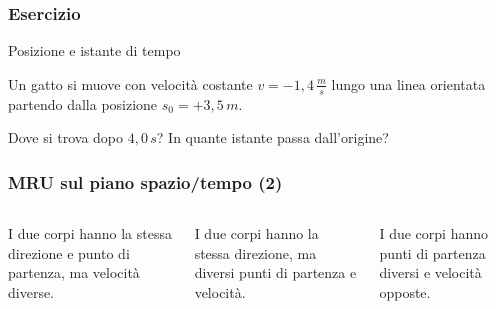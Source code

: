 \documentclass[]{beamer}
\theoremstyle{plain}
\begin{document}
\begin{frame}
\frametitle{Esercizio}
\begin{exampleblock}{Posizione e istante di tempo}
  \small{Un gatto si muove con velocità costante $ v = - 1,4 \, \frac{m}{s} $ lungo una linea orientata partendo dalla posizione $ s_0 = +3,5 \, m $. 

  Dove si trova dopo $ 4,0 \, s $? In quante istante passa dall'origine?}
\end{exampleblock}
\end{frame}




\begin{frame}
\frametitle{MRU sul piano spazio/tempo (2)}


\begin{columns}
\begin{column}{0.3\textwidth}
\begin{figure}\centering
{}
\end{figure}
{\small I due corpi hanno la stessa direzione e punto di partenza, ma velocità diverse.}
\end{column}
\begin{column}{0.3\textwidth}
\begin{figure}\centering
{}
\end{figure}
{\small I due corpi hanno la stessa direzione, ma diversi punti di partenza e velocità.}
\end{column}
\begin{column}{0.3\textwidth}
\begin{figure}\centering
{}
\end{figure}
{\small I due corpi hanno punti di partenza diversi e velocità opposte.}
\end{column}\end{columns}
\end{frame}
\end{document}
